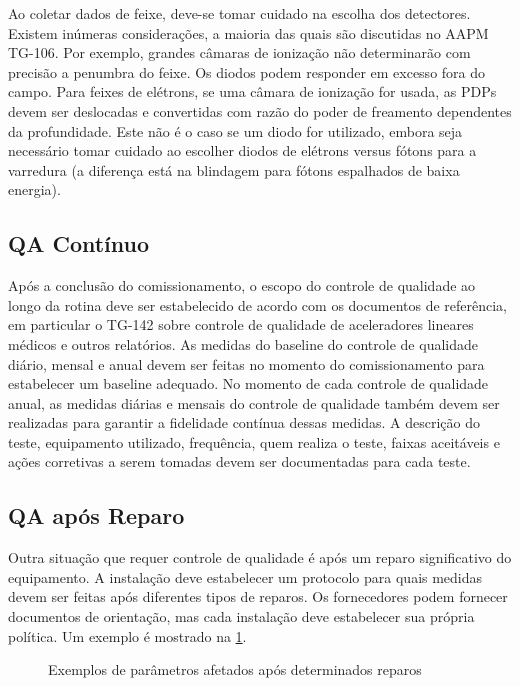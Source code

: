 \documentclass[11pt,a4paper]{article}
\newcounter{exemplo}
\begin{document}
	Ao coletar dados de feixe, deve-se tomar cuidado na escolha dos detectores. Existem inúmeras considerações, a maioria das quais são discutidas no AAPM TG-106. Por exemplo, grandes câmaras de ionização não determinarão com precisão a penumbra do feixe. Os diodos podem responder em excesso fora do campo. Para feixes de elétrons, se uma câmara de ionização for usada, as PDPs devem ser deslocadas e convertidas com razão do poder de freamento dependentes da profundidade. Este não é o caso se um diodo for utilizado, embora seja necessário tomar cuidado ao escolher diodos de elétrons versus fótons para a varredura (a diferença está na blindagem para fótons espalhados de baixa energia).

\subsection*{QA Contínuo}

	Após a conclusão do comissionamento, o escopo do controle de qualidade ao longo da rotina deve ser estabelecido de acordo com os documentos de referência, em particular o TG-142 sobre controle de qualidade de aceleradores lineares médicos e outros relatórios. As medidas do baseline do controle de qualidade diário, mensal e anual devem ser feitas no momento do comissionamento para estabelecer um baseline adequado. No momento de cada controle de qualidade anual, as medidas diárias e mensais do controle de qualidade também devem ser realizadas para garantir a fidelidade contínua dessas medidas. A descrição do teste, equipamento utilizado, frequência, quem realiza o teste, faixas aceitáveis e ações corretivas a serem tomadas devem ser documentadas para cada teste.

\subsection*{QA após Reparo}

	Outra situação que requer controle de qualidade é após um reparo significativo do equipamento. A instalação deve estabelecer um protocolo para quais medidas devem ser feitas após diferentes tipos de reparos. Os fornecedores podem fornecer documentos de orientação, mas cada instalação deve estabelecer sua própria política. Um exemplo é mostrado na \ref{fig:qaAposReparo}.

	\begin{figure}[!h]
		\centering
		\caption{Exemplos de parâmetros afetados após determinados reparos}
		\label{fig:qaAposReparo}
	\end{figure}
\end{document}
